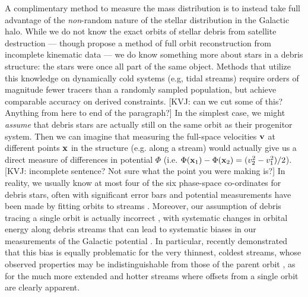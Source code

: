 \documentclass[preprint]{aastex}
\begin{document}
A complimentary method to measure the mass distribution is to instead take full advantage of the {\it non}-random nature of the stellar distribution in the Galactic halo.
While we do not know the exact orbits of  stellar debris from satellite destruction --- though \citet{eyre09b} propose a method of full orbit reconstruction from incomplete kinematic data --- we do know something more about stars in a debris structure: the stars were once all part of the same object.
Methods that utilize this knowledge on dynamically cold systems (e.g, tidal streams) require orders of magnitude fewer tracers than a randomly sampled population, but achieve comparable accuracy on derived constraints.
[KVJ: can we cut some of this? Anything from here to end of the paragraph?] In the simplest case, we might {\it assume} that debris stars are actually still on the same orbit as their progenitor system.
Then we can imagine that measuring the full-space velocities ${\bf v}$ at different points ${\bf x}$ in the structure (e.g. along a stream) would actually give us a direct
measure of differences in potential $\Phi$ (i.e. $\Phi({\bf x}_1)-\Phi({\bf x}_2)=(v_2^2-v_1^2)/2$).
[KVJ: incomplete sentence? Not sure what the point you were making is?] In reality, we usually know at most four of the six phase-space co-ordinates for debris stars, often with significant error bars and potential measurements have been made by fitting orbits to streams \citep[e.g.,][]{helmi04,johnston05,koposov10,law10}.
Moreover, our assumption of debris tracing a single orbit is actually incorrect \citep[see][for discussions of the orbit distribution in tidal debris]{johnston98,helmi99}, with
systematic changes in orbital energy along debris streams that can lead to systematic biases in our measurements of the Galactic potential \citep{eyre09a,varghese11}.
In particular, \citet{sanders13a} recently demonstrated that this bias is equally problematic for the very thinnest, coldest streams, whose observed properties may be indistinguishable from those of the parent orbit \citep[e.g. such as the globular cluster, GD1 --- see][]{koposov10}, as for the much more extended and hotter streams \citep[e.g. such as debris from the Sagittarius dwarf galaxy --- see][]{majewski03} where offsets from a single orbit are clearly apparent.
\end{document}
